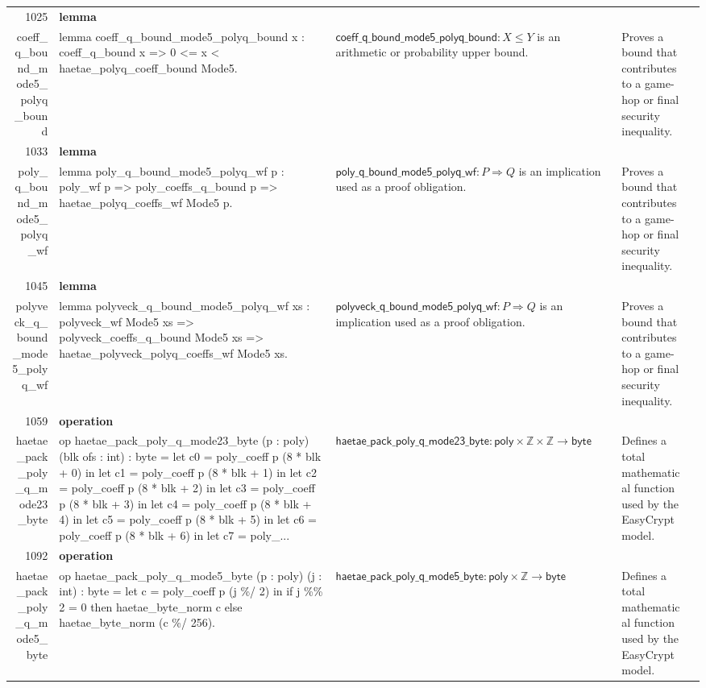 \documentclass[10pt]{article}
\newcommand{\ec}[1]{\begingroup\ttfamily\scriptsize #1\endgroup}
\begin{document}
\begin{longtable}{r L{0.17\textwidth} L{0.26\textwidth} L{0.27\textwidth} L{0.20\textwidth}}
1025 & \textbf{lemma}\\\ec{coeff\_q\_bound\_mode5\_polyq\_bound} & \ec{lemma coeff\_q\_bound\_mode5\_polyq\_bound x : coeff\_q\_bound x => 0 <= x < haetae\_polyq\_coeff\_bound Mode5.} & \(\mathsf{coeff\_q\_bound\_mode5\_polyq\_bound} : X \le Y\) is an arithmetic or probability upper bound. & Proves a bound that contributes to a game-hop or final security inequality. \\
1033 & \textbf{lemma}\\\ec{poly\_q\_bound\_mode5\_polyq\_wf} & \ec{lemma poly\_q\_bound\_mode5\_polyq\_wf p : poly\_wf p => poly\_coeffs\_q\_bound p => haetae\_polyq\_coeffs\_wf Mode5 p.} & \(\mathsf{poly\_q\_bound\_mode5\_polyq\_wf} : P \Rightarrow Q\) is an implication used as a proof obligation. & Proves a bound that contributes to a game-hop or final security inequality. \\
1045 & \textbf{lemma}\\\ec{polyveck\_q\_bound\_mode5\_polyq\_wf} & \ec{lemma polyveck\_q\_bound\_mode5\_polyq\_wf xs : polyveck\_wf Mode5 xs => polyveck\_coeffs\_q\_bound Mode5 xs => haetae\_polyveck\_polyq\_coeffs\_wf Mode5 xs.} & \(\mathsf{polyveck\_q\_bound\_mode5\_polyq\_wf} : P \Rightarrow Q\) is an implication used as a proof obligation. & Proves a bound that contributes to a game-hop or final security inequality. \\
1059 & \textbf{operation}\\\ec{haetae\_pack\_poly\_q\_mode23\_byte} & \ec{op haetae\_pack\_poly\_q\_mode23\_byte (p : poly) (blk ofs : int) : byte = let c0 = poly\_coeff p (8 * blk + 0) in let c1 = poly\_coeff p (8 * blk + 1) in let c2 = poly\_coeff p (8 * blk + 2) in let c3 = poly\_coeff p (8 * blk + 3) in let c4 = poly\_coeff p (8 * blk + 4) in let c5 = poly\_coeff p (8 * blk + 5) in let c6 = poly\_coeff p (8 * blk + 6) in let c7 = poly\_...} & \(\mathsf{haetae\_pack\_poly\_q\_mode23\_byte} : \mathsf{poly} \times \mathbb{Z} \times \mathbb{Z} \to \mathsf{byte}\) & Defines a total mathematical function used by the EasyCrypt model. \\
1092 & \textbf{operation}\\\ec{haetae\_pack\_poly\_q\_mode5\_byte} & \ec{op haetae\_pack\_poly\_q\_mode5\_byte (p : poly) (j : int) : byte = let c = poly\_coeff p (j \%/ 2) in if j \%\% 2 = 0 then haetae\_byte\_norm c else haetae\_byte\_norm (c \%/ 256).} & \(\mathsf{haetae\_pack\_poly\_q\_mode5\_byte} : \mathsf{poly} \times \mathbb{Z} \to \mathsf{byte}\) & Defines a total mathematical function used by the EasyCrypt model. \\

\end{longtable}
\end{document}
